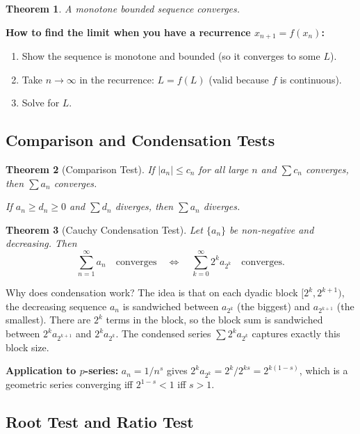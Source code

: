 \documentclass[11pt]{article}
\theoremstyle{myplain}
\newtheorem{theorem}{Theorem}[section]
\theoremstyle{definition}
\theoremstyle{remark}
\begin{document}
\begin{theorem}
A monotone bounded sequence converges.
\end{theorem}

\textbf{How to find the limit when you have a recurrence $x_{n+1} = f(x_n)$:}
\begin{enumerate}
  \item Show the sequence is monotone and bounded (so it converges to some $L$).
  \item Take $n \to \infty$ in the recurrence: $L = f(L)$ (valid because $f$ is continuous).
  \item Solve for $L$.
\end{enumerate}

\subsection{Comparison and Condensation Tests}

\begin{theorem}[Comparison Test]
If $|a_n| \leq c_n$ for all large $n$ and $\sum c_n$ converges, then $\sum a_n$ converges.

If $a_n \geq d_n \geq 0$ and $\sum d_n$ diverges, then $\sum a_n$ diverges.
\end{theorem}

\begin{theorem}[Cauchy Condensation Test]
Let $\{a_n\}$ be non-negative and decreasing. Then
$$\sum_{n=1}^\infty a_n \quad \text{converges} \quad \Longleftrightarrow \quad \sum_{k=0}^\infty 2^k a_{2^k} \quad \text{converges}.$$
\end{theorem}

\begin{insight}
Why does condensation work? The idea is that on each dyadic block $[2^k, 2^{k+1})$, the decreasing sequence $a_n$ is sandwiched between $a_{2^k}$ (the biggest) and $a_{2^{k+1}}$ (the smallest). There are $2^k$ terms in the block, so the block sum is sandwiched between $2^k a_{2^{k+1}}$ and $2^k a_{2^k}$. The condensed series $\sum 2^k a_{2^k}$ captures exactly this block size.

\textbf{Application to $p$-series:} $a_n = 1/n^s$ gives $2^k a_{2^k} = 2^k / 2^{ks} = 2^{k(1-s)}$, which is a geometric series converging iff $2^{1-s} < 1$ iff $s > 1$.
\end{insight}

\subsection{Root Test and Ratio Test}
\end{document}
